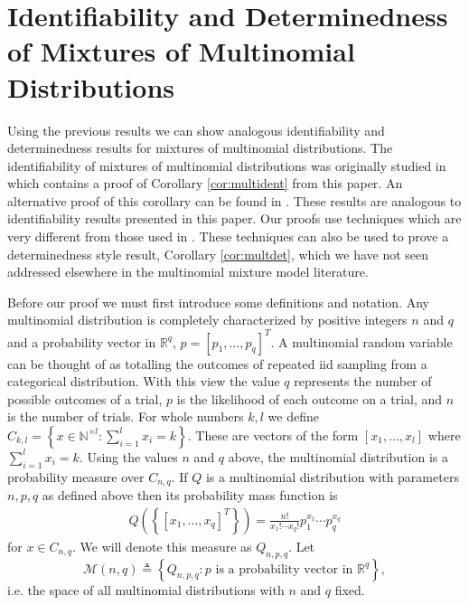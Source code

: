 \documentclass[aos,preprint]{imsart}
\def\rn{\mathbb{R}}
\def\nn{\mathbb{N}}
\def\l{\left}
\def\r{\right}
\def\sM{\pazocal{M}}
\def\sM{\mathscr{M}}
\theoremstyle{plain}
\theoremstyle{defintion}
\begin{document}
	\section{Identifiability and Determinedness of Mixtures of Multinomial Distributions}
	Using the previous results we can show analogous identifiability and determinedness results for mixtures of multinomial distributions. The identifiability of mixtures of multinomial distributions was originally studied in \cite{kim1984} which contains a proof of Corollary \ref{cor:multident} from this paper. An alternative proof of this corollary can be found in \cite{elmore2003}. These results are analogous to identifiability results presented in this paper. Our proofs use techniques which are very different from those used in \cite{kim1984,elmore2003}. These techniques can also be used to prove a determinedness style result, Corollary \ref{cor:multdet}, which we have not seen addressed elsewhere in the multinomial mixture model literature.

	Before our proof we must first introduce some definitions and notation. Any multinomial distribution is completely characterized by positive integers $n$ and $q$ and a probability vector in $\rn^q$, $ p = \left[ p_1,\ldots,p_q \right]^T$. A multinomial random variable can be thought of as totalling the outcomes of repeated iid sampling from a categorical distribution. With this view the value $q$ represents the number of possible outcomes of a trial, $p$ is the likelihood of each outcome on a trial, and $n$ is the number of trials. For whole numbers $k,l$ we define $C_{k,l}= \l\{x \in \nn^{\times l} : \sum_{i=1}^l x_i = k\r\}$. These are vectors of the form $\left[ x_1,\ldots,x_l \right]$ where $\sum_{i=1}^l x_i =k$. Using the values $n$ and $q$ above, the multinomial distribution is a probability measure over $C_{n,q}$. If $Q$ is a multinomial distribution with parameters $n,p,q$ as defined above then its probability mass function is 
	\begin{eqnarray*}
		Q\left(\l\{ \left[ x_1,\ldots,x_q \right]^T\r\} \right) =
		\frac{n!}{x_1! \cdots x_q !} p_1^{x_1}\cdots p_q^{x_q}
	\end{eqnarray*} 
	for $x \in C_{n,q}$.
	We will denote this measure as $Q_{n,p,q}$.
	Let 
	\begin{equation*}
		\sM\left( n,q \right)\triangleq \l\{Q_{n,p,q} : p \text{ is a probability vector in } \rn^q \r\},
	\end{equation*}
	i.e. the space of all multinomial distributions with $n$ and $q$ fixed.
\end{document}
